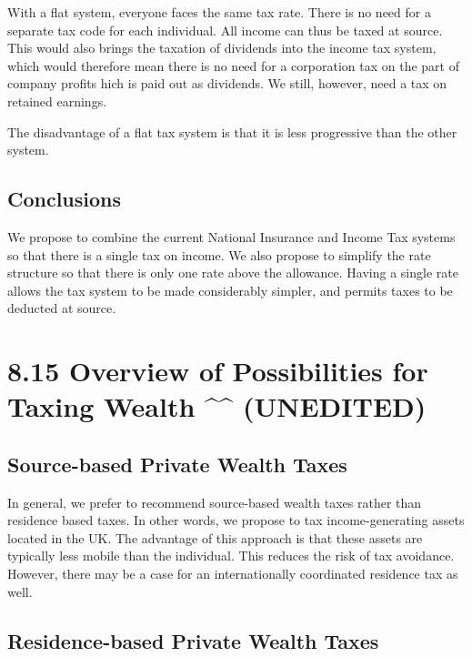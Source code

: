 \documentclass[]{tufte-handout}
\begin{document}
With a flat system, everyone faces the same tax rate. There is no need
for a separate tax code for each individual. All income can thus be
taxed at source. This would also brings the taxation of dividends into
the income tax system, which would therefore mean there is no need for a
corporation tax on the part of company profits hich is paid out as
dividends. We still, however, need a tax on retained earnings.

The disadvantage of a flat tax system is that it is less progressive
than the other system.

\hypertarget{conclusions-2}{%
\subsection{Conclusions}\label{conclusions-2}}

We propose to combine the current National Insurance and Income Tax
systems so that there is a single tax on income. We also propose to
simplify the rate structure so that there is only one rate above the
allowance. Having a single rate allows the tax system to be made
considerably simpler, and permits taxes to be deducted at source.

\hypertarget{overview-of-possibilities-for-taxing-wealth-unedited}{%
\section{8.15 Overview of Possibilities for Taxing Wealth \^{}\^{}
(UNEDITED)}\label{overview-of-possibilities-for-taxing-wealth-unedited}}

\hypertarget{source-based-private-wealth-taxes}{%
\subsection{Source-based Private Wealth
Taxes}\label{source-based-private-wealth-taxes}}

In general, we prefer to recommend source-based wealth taxes rather than
residence based taxes. In other words, we propose to tax
income-generating assets located in the UK. The advantage of this
approach is that these assets are typically less mobile than the
individual. This reduces the risk of tax avoidance. However, there may
be a case for an internationally coordinated residence tax as well.

\hypertarget{residence-based-private-wealth-taxes}{%
\subsection{Residence-based Private Wealth
Taxes}\label{residence-based-private-wealth-taxes}}
\end{document}
